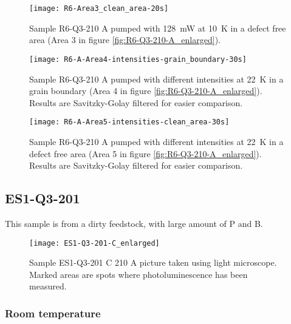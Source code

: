\begin{figure}[H]
\centering
\texttt{[image: R6-Area3\_clean\_area-20s]}
\caption[R6-Q3-210 at a defect free area]{Sample R6-Q3-210 A pumped with 128~mW at 10~K in a defect free area (Area 3 in figure \ref{fig:R6-Q3-210-A_enlarged}).}
\label{fig:R6-Area3_clean_area-20s}%
\end{figure}


\begin{figure}[H]
\centering
\texttt{[image: R6-A-Area4-intensities-grain\_boundary-30s]}
\caption[R6-Q3-210 at a grain boundary]{Sample R6-Q3-210 A pumped with different intensities at 22~K in a grain boundary (Area 4 in figure \ref{fig:R6-Q3-210-A_enlarged}). Results are Savitzky-Golay filtered for easier comparison.}
\label{fig:R6-A-Area4-intensities-grain_boundary-30s}%
\end{figure}


\begin{figure}[H]
\centering
\texttt{[image: R6-A-Area5-intensities-clean\_area-30s]}
\caption[R6-Q3-210 at a defect free area]{Sample R6-Q3-210 A pumped with different intensities at 22~K in a defect free area (Area 5 in figure \ref{fig:R6-Q3-210-A_enlarged}). Results are Savitzky-Golay filtered for easier comparison.}
\label{fig:R6-A-Area5-intensities-clean_area-30s}%
\end{figure}








\subsection{ES1-Q3-201}

This sample is from a dirty feedstock, with large amount of P and B.


\begin{figure}[H]
\centering
\texttt{[image: ES1-Q3-201-C\_enlarged]}
\caption[ES1-Q3-201 C from light microscope]{Sample ES1-Q3-201 C 210 A picture taken using light microscope. Marked areas are spots where photoluminescence has been measured.}
\label{fig:ES1-Q3-201-C_enlarged}%
\end{figure}

\subsubsection{Room temperature}

